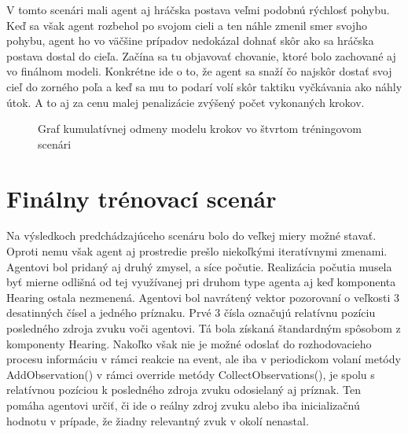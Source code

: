 \documentclass[slovak, master]{diploma}
\begin{document}
V tomto scenári mali agent aj hráčska postava veľmi podobnú rýchlosť pohybu. Keď sa však agent rozbehol po svojom cieli a ten náhle zmenil smer svojho pohybu, agent ho vo väčšine prípadov nedokázal dohnať skôr ako sa hráčska postava dostal do cieľa. Začína sa tu objavovať chovanie, ktoré bolo zachované aj vo finálnom modeli. Konkrétne ide o to, že agent sa snaží čo najskôr dostať svoj cieľ do zorného poľa a keď sa mu to podarí volí skôr taktiku vyčkávania ako náhly útok. A to aj za cenu malej penalizácie zvýšený počet vykonaných krokov. 

\begin{figure}[!htbp]
    \centering
    \caption{Graf kumulatívnej odmeny modelu krokov vo štvrtom tréningovom scenári}
    \label{plt:fourthcenario}
\end{figure}

\section{Finálny trénovací scenár}
\label{sec:FinalScenario}
Na výsledkoch predchádzajúceho scenáru bolo do veľkej miery možné stavať. Oproti nemu však agent aj prostredie prešlo niekoľkými iteratívnymi zmenami. Agentovi bol pridaný aj druhý zmysel, a síce počutie. Realizácia počutia musela byť mierne odlišná od tej využívanej pri druhom type agenta aj keď komponenta Hearing ostala nezmenená. Agentovi bol navrátený vektor pozorovaní o veľkosti 3 desatinných čísel a jedného príznaku. Prvé 3 čísla označujú relatívnu pozíciu posledného zdroja zvuku voči agentovi. Tá bola získaná štandardným spôsobom z komponenty Hearing. Nakoľko však nie je možné odoslať do rozhodovacieho procesu informáciu v rámci reakcie na event, ale iba v periodickom volaní metódy AddObservation() v rámci override metódy CollectObservations(), je spolu s relatívnou pozíciou k posledného zdroja zvuku odosielaný aj príznak. Ten pomáha agentovi určiť, či ide o reálny zdroj zvuku alebo iba inicializačnú hodnotu v prípade, že žiadny relevantný zvuk v okolí nenastal. 
\end{document}
